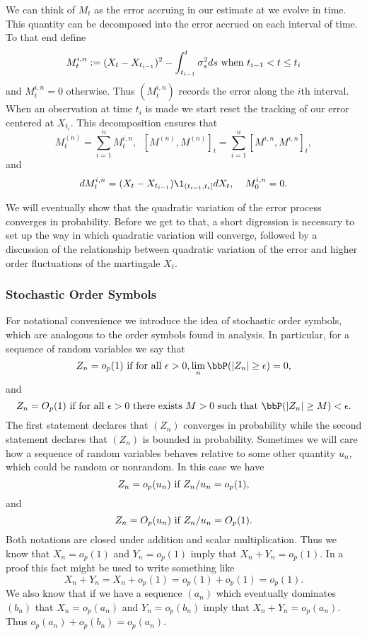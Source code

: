 \documentclass{report}
\begin{document}
We can think of $M_t$ as the error accruing in our estimate at we
evolve in time.  This quantity can be decomposed into the error
accrued on each interval of time.  To that end define
\[
M^{i,n}_t : = (X_{t} - X_{t_{i-1}})^2 - \int_{t_{i-1}}^t \sigma_s^2 ds
\textmd{ when } t_{i-1} < t \leq t_{i}
\]
and $M^{i,n}_t = 0$ otherwise.  Thus $(M^{i,n}_t)$ records the error
along the $i$th interval.  When an observation at time $t_i$ is made
we start reset the tracking of our error centered at $X_{t_i}$.  This
decomposition ensures that
\[
M^{(n)}_t = \sum_{i=1}^n M^{i,n}_t,  \;\; [M^{(n)},M^{(n)}]_t =
\sum_{i=1}^n [M^{i,n} ,M^{i,n}]_t, 
\]
and
\[
d M^{i,n}_t = (X_t - X_{t_{i-1}}) \1_{(t_{i-1},t_i]} d X_t, \;\;\;\;
M^{i,n}_0 = 0.
\]

We will eventually show that the quadratic variation of the error
process converges in probability.  Before we get to that, a short
digression is necessary to set up the way in which quadratic variation
will converge, followed by a discussion of the relationship between
quadratic variation of the error and higher order fluctuations of the
martingale $X_t$.


\subsubsection{Stochastic Order Symbols}

For notational convenience we introduce the idea of stochastic order
symbols, which are analogous to the order symbols found in analysis. 
In particular, for a sequence of random variables we say that
\[
Z_n = o_p(1) \textmd{ if for all } \epsilon > 0, \lim_n \bbP(|Z_n|
\geq \epsilon) = 0,
\]
and
\[
Z_n = O_p(1) \textmd{ if for all } \epsilon > 0 \textmd{ there exists
} M > 0 \textmd{ such that } \bbP(|Z_n| \geq M) < \epsilon.
\]
The first statement declares that $(Z_n)$ converges in probability
while the second statement declares that $(Z_n)$ is bounded in
probability.  Sometimes we will care how a sequence of random
variables behaves relative to some other quantity $u_n$, which could
be random or nonrandom.  In this case we have
\[
Z_n = o_p(u_n) \textmd{ if } Z_n / u_n = o_p(1),
\]
and
\[
Z_n = O_p(u_n) \textmd{ if } Z_n / u_n = O_p(1).
\]
Both notations are closed under addition and scalar multiplication. 
Thus we know that $X_n = o_p(1)$ and $Y_n = o_p(1)$ imply that $X_n +
Y_n = o_p(1)$.  In a proof this fact might be used to write something
like 
\[
X_n + Y_n = X_n + o_p(1) = o_p(1) + o_p(1) = o_p(1).
\]
We also know that if we have a sequence $(a_n)$ which eventually
dominates $(b_n)$ that $X_n = o_p(a_n)$ and $Y_n = o_p(b_n)$ imply
that $X_n + Y_n = o_p(a_n)$.  Thus $o_p(a_n) + o_p(b_n) = o_p(a_n)$. 
\end{document}
